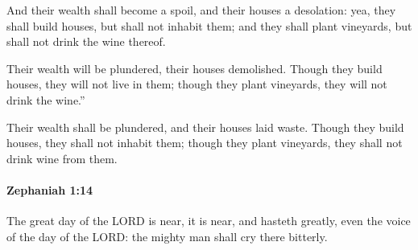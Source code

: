 			\begin{versebox}
					\item[BHS] 
					\item[LXX] 
					\item[ASV] And their wealth shall become a spoil, and their houses a desolation: yea, they shall build houses, but shall not inhabit them; and they shall plant vineyards, but shall not drink the wine thereof.
					\item[NIV] Their wealth will be plundered, their houses demolished. Though they build houses, they will not live in them; though they plant vineyards, they will not drink the wine.”
					\item[NRSV] Their wealth shall be plundered, and their houses laid waste. Though they build houses, they shall not inhabit them; though they plant vineyards, they shall not drink wine from them.
			\end{versebox}

		\paragraph{Zephaniah 1:14} %
			\label{ZEPHANIAH-1-14}

			The great day of the LORD is near, it is near, and hasteth greatly, even the voice of the day of the LORD: the mighty man shall cry there bitterly.

